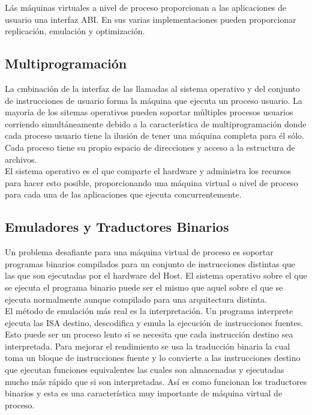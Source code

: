 \documentclass[10pt,a4paper,spanish]{report}
\begin{document}
  \noindent
  Lás máquinas virtuales a nivel de proceso proporcionan a las aplicaciones de usuario una interfaz ABI. En sus varias implementaciones pueden proporcionar replicación, emulación y optimización.

  \subsection{Multiprogramación}

  \noindent
  La cmbinación de la interfaz de las llamadas al sistema operativo y del conjunto de instrucciones de usuario forma la máquina que ejecuta un proceso usuario. La mayoría de los sitemas operativos pueden soportar múltiples procesos usuarios corriendo simultáneamente debido a la característica de multiprogramación donde cada proceso usuario tiene la ilusión de tener una máquina completa para él sólo. Cada proceso tiene su propio espacio de direcciones y acceso a la estructura de archivos.\\

  \noindent
  El sistema operativo es el que comparte el hardware y administra los recursos para hacer esto posible, proporcionando una máquina virtual o nivel de proceso para cada una de las aplicaciones que ejecuta concurrentemente.

  \subsection{Emuladores y Traductores Binarios}

  \noindent
  Un problema desafiante para una máquina virtual de proceso es soportar programas binarios compilados para un conjunto de instrucciones distintas que las que son ejecutadas por el hardware del Host. El sistema operativo sobre el que se ejecuta el programa binario puede ser el mismo que aquel sobre el que se ejecuta normalmente aunque compilado para una arquitectura distinta. \\

  \noindent
  El método de emulación más real es la interpretación. Un programa interprete ejecuta las ISA destino, descodifica y emula la ejecución de instrucciones fuentes. Esto puede ser un proceso lento si se necesita que cada instrucción destino sea interpretada.
  Para mejorar el rendimiento se usa la traducción binaria la cual toma un bloque de instrucciones fuente y lo convierte a las instrucciones destino que ejecutan funciones equivalentes las cuales son almacenadas y ejecutadas mucho más rápido que si son interpretadas. Así es como funcionan los traductores binarios y esta es una característica muy importante de máquina virtual de proceso.\\
\end{document}
